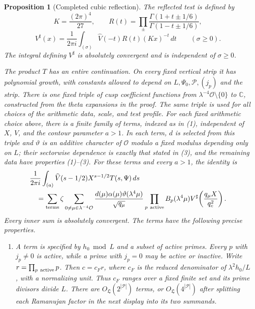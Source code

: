\documentclass[11pt,a4paper]{article}
\numberwithin{equation}{section}
\numberwithin{figure}{section}
\newtheorem{proposition}[theorem]{Proposition}
\theoremstyle{definition}
\theoremstyle{remark}
\begin{document}
\begin{proposition}[Completed cubic reflection]
The reflected test is defined by
\[
 K=\frac{(2\pi)^4}{27},\qquad
 R(t)=\prod_{\pm}\frac{\Gamma(1+t\pm1/6)}{\Gamma(1-t\pm1/6)},
\]
\[
 V^\sharp(x)=\frac1{2\pi i}\int_{(\sigma)}
       \widehat V(-t)R(t)(Kx)^{-t}\,dt\qquad(\sigma\ge0).
\]
The integral defining $V^\sharp$ is absolutely convergent and is
independent of $\sigma\ge0$.

The product $T$ has an entire continuation.  On every fixed vertical
strip it has polynomial growth, with constants allowed to depend on
$L,\Psi_0,\mathcal P,(j_p)$ and the strip.  There is one fixed triple of
cusp coefficient functions from $\lambda^{-4}\mathcal O\setminus\{0\}$ to
$\mathbb C$, constructed from the theta expansions in the proof.  The same
triple is used for all choices of the arithmetic data, scale, and test profile.
For each fixed arithmetic choice above, there is a finite family of terms,
indexed as in (1), independent
of $X$, $V$, and the contour parameter $a>1$.  In each term, $d$ is selected
from this triple and $\vartheta$ is an additive character of $\mathcal O$
modulo a fixed modulus depending only on $L$; their sectorwise dependence is
exactly that stated in (3), and the remaining data have properties (1)--(3).
For these terms and every $a>1$, the identity is
\begin{equation}\label{eq:reflection}
 \begin{aligned}
 &\frac1{2\pi i}\int_{(a)}\widehat V(s-1/2)X^{s-1/2}T(s,\Psi)\,ds\\
 &\quad=\sum_{\text{terms}}\zeta
 \sum_{0\ne\mu\in\lambda^{-4}\mathcal O}
 \frac{d(\mu)\alpha(\mu)\vartheta(\lambda^4\mu)}{\sqrt{q_\mu}}
 \prod_{p\ {\rm active}}B_p(\lambda^4\mu)
 V^\sharp\!\left(\frac{q_\mu X}{q_c^2}\right).
 \end{aligned}
\end{equation}
Every inner sum is absolutely convergent.  The terms have the following
precise properties.

\begin{enumerate}
\item A term is specified by $h_0\bmod L$ and a subset of active primes.
Every $p$ with $j_p\ne0$ is active, while a prime with $j_p=0$ may be
active or inactive.  Write $r=\prod_{p\ {\rm active}}p$.  Then
$c=c_Fr$, where $c_F$ is the reduced denominator of
$\lambda^2h_0/L$, with a normalizing unit.  Thus $c_F$ ranges over a
fixed finite set and its prime divisors divide $L$.  There are
$O_{\mathfrak L}(2^{|\mathcal P|})$ terms, or
$O_{\mathfrak L}(4^{|\mathcal P|})$ after splitting each Ramanujan
factor in the next display into its two summands.


\end{enumerate}
\end{proposition}
\end{document}
